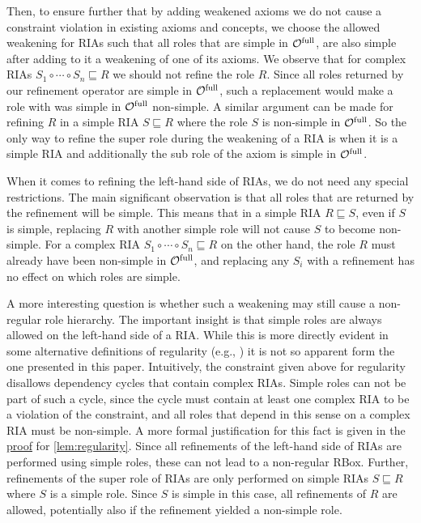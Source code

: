 \documentclass[
]{ceurart}
\begin{document}
Then, to ensure further that by adding weakened axioms we do not cause a constraint violation in existing axioms and concepts, we choose the allowed weakening for RIAs such that all roles that are simple in ${\mathcal{O}^\textnormal{full}}$, are also simple after adding to it a weakening of one of its axioms. We observe that for complex RIAs $S_1 \circ \cdots \circ S_n \sqsubseteq R$ we should not refine the role $R$. Since all roles returned by our refinement operator are simple in ${\mathcal{O}^\textnormal{full}}$, such a replacement would make a role with was simple in ${\mathcal{O}^\textnormal{full}}$ non-simple. A similar argument can be made for refining $R$ in a simple RIA $S \sqsubseteq R$ where the role $S$ is non-simple in ${\mathcal{O}^\textnormal{full}}$. So the only way to refine the super role during the weakening of a RIA is when it is a simple RIA and additionally the sub role of the axiom is simple in ${\mathcal{O}^\textnormal{full}}$.

When it comes to refining the left-hand side of RIAs, we do not need any special restrictions. The main significant observation is that all roles that are returned by the refinement will be simple. This means that in a simple RIA $R \sqsubseteq S$, even if $S$ is simple, replacing $R$ with another simple role will not cause $S$ to become non-simple. For a complex RIA $S_1 \circ \cdots \circ S_n \sqsubseteq R$ on the other hand, the role $R$ must already have been non-simple in ${\mathcal{O}^\textnormal{full}}$, and replacing any $S_i$ with a refinement has no effect on which roles are simple.

A more interesting question is whether such a weakening may still cause a non-regular role hierarchy. The important insight is that simple roles are always allowed on the left-hand side of a RIA. While this is more directly evident in some alternative definitions of regularity (e.g., \cite{rudolph2011foundations}) it is not so apparent form the one presented in this paper. Intuitively, the constraint given above for regularity disallows dependency cycles that contain complex RIAs. Simple roles can not be part of such a cycle, since the cycle must contain at least one complex RIA to be a violation of the constraint, and all roles that depend in this sense on a complex RIA must be non-simple. A more formal justification for this fact is given in the \hyperref[proof:regularity]{proof} for \cref{lem:regularity}.
Since all refinements of the left-hand side of RIAs are performed using simple roles, these can not lead to a non-regular RBox. Further, refinements of the super role of RIAs are only performed on simple RIAs $S \sqsubseteq R$ where $S$ is a simple role. Since $S$ is simple in this case, all refinements of $R$ are allowed, potentially also if the refinement yielded a non-simple role.
\end{document}
